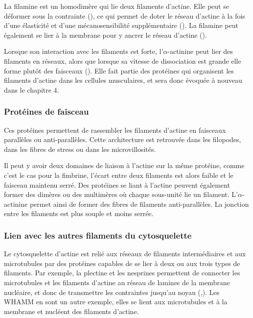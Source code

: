 \documentclass{report}
\begin{document}
La filamine est un homodimère qui lie deux filaments d'actine. Elle peut se déformer sous la contrainte (\cite{furuike_mechanical_2001}), ce qui permet de doter le réseau d'actine à la fois d'une élasticité et d'une mécanosensibilité supplémentaire (\cite{kainulainen_cell_2002}).
La filamine peut également se lier à la membrane pour y ancrer le réseau d'actine (\cite{yamazaki_section:_2002}).


Lorsque son interaction avec les filaments est forte, l'$\alpha$-actinine peut lier des filaments en réseaux, alors que lorsque sa vitesse de dissociation est grande elle forme plutôt des faisceaux (\cite{wachsstock_affinity_1993}). Elle fait partie des protéines qui organisent les filaments d'actine dans les cellules musculaires, et sera donc évoquée à nouveau dans le chapitre 4. 


\subsubsection{Protéines de faisceau}

Ces protéines permettent de rassembler les filaments d'actine en faisceaux parallèles ou anti-parallèles. Cette architecture est retrouvée dans les filopodes, dans les fibres de stress ou dans les microvillosités.

Il peut y avoir deux domaines de liaison à l'actine sur la même protéine, comme c'est le cas pour la fimbrine, l'écart entre deux filaments est alors faible et le faisceau maintenu serré. 
Des protéines se liant à l'actine peuvent également former des dimères ou des multimères où chaque sous-unité lie un filament. L'$\alpha$-actinine permet ainsi de former des fibres de filaments anti-parallèles. La jonction entre les filaments est plus souple et moins serrée. 

\subsubsection{Lien avec les autres filaments du cytosquelette}

Le cytosquelette d'actine est relié aux réseaux de filaments intermédiaires et aux microtubules par des protéines capables de se lier à deux ou aux trois types de filaments. 
Par exemple, la plectine et les nesprines permettent de connecter les microtubules et les filaments d'actine au réseau de lamines de la membrane nucléaire, et donc de transmettre les contraintes jusqu'au noyau (\cite{wiche_role_1998},\cite{tapley_connecting_2013}). 
Les WHAMM en sont un autre exemple, elles se lient aux microtubules et à la membrane et nucléent des filaments d'actine. 
\end{document}
